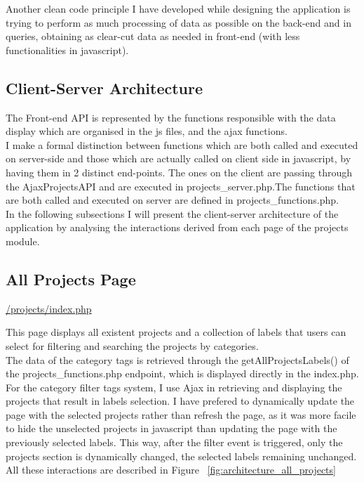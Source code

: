Another clean code principle I have developed while designing the application is trying to perform as much processing of data as possible on the back-end and in queries, obtaining as clear-cut data as needed in front-end (with less functionalities in javascript). 


\subsection{Client-Server Architecture}

The Front-end API is represented by the functions responsible with the data display which are organised in the js files, and the ajax functions. \\

I make a formal distinction between functions which are both called and executed on server-side and those which are actually called on client side in javascript, by having them in 2 distinct end-points. The ones on the client are passing through the AjaxProjectsAPI and are executed in projects\_server.php.The functions that are both called and executed on server are defined in projects\_functions.php. \\

In the following subsections I will present the client-server architecture of the application by analysing the interactions derived from each page of the projects module. 

\subsection{All Projects Page}
\url{/projects/index.php}

This page displays all existent projects and a collection of labels that users can select for filtering and searching the projects by categories. \\

The data of the category tags is retrieved through the getAllProjectsLabels() of the projects\_functions.php endpoint, which is displayed directly in the index.php.\\

For the category filter tags system, I use Ajax in retrieving and displaying the projects that result in labels selection. I have prefered to dynamically update the page with the selected projects rather than refresh the page, as it was more facile to hide the unselected projects in javascript than updating the page with the previously selected labels. This way, after the filter event is triggered, only the projects section is dynamically changed, the selected labels remaining unchanged. All these interactions are described in Figure ~\ref{fig:architecture_all_projects}\\


